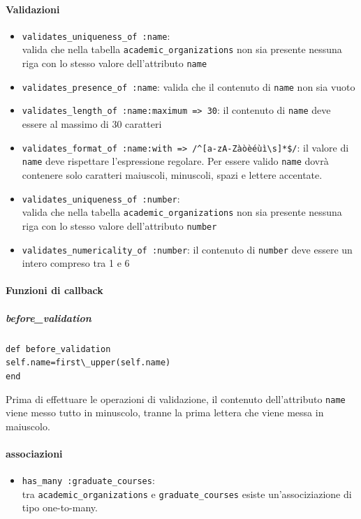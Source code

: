 \documentclass[11pt,a4paper]{article}
\begin{document}
\paragraph{Validazioni}
\begin{itemize}
 \item \verb|validates_uniqueness_of :name|:\\ valida che nella tabella \verb|academic_organizations| non sia presente nessuna riga con lo stesso valore dell'attributo \verb|name| 
\item \verb|validates_presence_of :name|: valida che il contenuto di \verb|name| non sia vuoto
\item \verb|validates_length_of :name:maximum => 30|: il contenuto di \verb|name| deve essere al massimo di 30 caratteri
\item \verb|validates_format_of :name:with => /^[a-zA-Zàòèéùì\s]*$/|: il valore di \verb|name| deve rispettare l'espressione regolare. Per essere valido \verb|name| dovrà contenere solo caratteri maiuscoli, minuscoli, spazi e lettere accentate.
\item \verb|validates_uniqueness_of :number|:\\ valida che nella tabella \verb|academic_organizations| non sia presente nessuna riga con lo stesso valore dell'attributo \verb|number|
 \item \verb|validates_numericality_of :number|: il contenuto di \verb|number| deve essere un intero compreso tra 1 e 6
\end{itemize}
\paragraph{Funzioni di callback}
\subparagraph{before\_validation}
\begin{center}
 \verb|def before_validation|\\
   \verb|self.name=first\_upper(self.name)|\\
 \verb|end|
\end{center}
Prima di effettuare le operazioni di validazione, il contenuto dell'attributo \verb|name| viene messo tutto in minuscolo, tranne la prima lettera che viene messa in maiuscolo. 
\paragraph{associazioni}
\begin{itemize}
\item \verb|has_many :graduate_courses|: \\tra \verb|academic_organizations| e \verb|graduate_courses| esiste un'associziazione di tipo one-to-many. 
\end{itemize}
\end{document}
